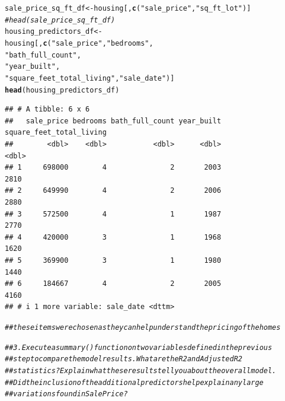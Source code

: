 \documentclass{article}\usepackage[]{graphicx}\usepackage[]{xcolor}
\makeatletter
\newcommand{\hlstr}[1]{\textcolor[rgb]{0.192,0.494,0.8}{#1}}%
\newcommand{\hlcom}[1]{\textcolor[rgb]{0.678,0.584,0.686}{\textit{#1}}}%
\newcommand{\hlstd}[1]{\textcolor[rgb]{0.345,0.345,0.345}{#1}}%
\newcommand{\hlkwb}[1]{\textcolor[rgb]{0.69,0.353,0.396}{#1}}%
\newcommand{\hlkwd}[1]{\textcolor[rgb]{0.737,0.353,0.396}{\textbf{#1}}}%
\newenvironment{kframe}{%
 \def\at@end@of@kframe{}%
 \ifinner\ifhmode%
  \def\at@end@of@kframe{\end{minipage}}%
  \begin{minipage}{\columnwidth}%
 \fi\fi%
 \def\FrameCommand##1{\hskip\@totalleftmargin \hskip-\fboxsep
 \colorbox{shadecolor}{##1}\hskip-\fboxsep
     \hskip-\linewidth \hskip-\@totalleftmargin \hskip\columnwidth}%
 \MakeFramed {\advance\hsize-\width
   \@totalleftmargin\z@ \linewidth\hsize
   \@setminipage}}%
 {\par\unskip\endMakeFramed%
 \at@end@of@kframe}
\newenvironment{knitrout}{}{} %
\makeatother
\begin{document}
\begin{knitrout}
\begin{kframe}
\begin{alltt}
\hlstd{sale_price_sq_ft_df} \hlkwb{<-} \hlstd{housing [,}\hlkwd{c}\hlstd{(}\hlstr{"sale_price"}\hlstd{,}\hlstr{"sq_ft_lot"}\hlstd{)]}
\hlcom{#head(sale_price_sq_ft_df)}
\hlstd{housing_predictors_df} \hlkwb{<-}
  \hlstd{housing[,} \hlkwd{c}\hlstd{(}\hlstr{"sale_price"}\hlstd{,}\hlstr{"bedrooms"}\hlstd{,}
              \hlstr{"bath_full_count"}\hlstd{,}
              \hlstr{"year_built"}\hlstd{,}
              \hlstr{"square_feet_total_living"}\hlstd{,}\hlstr{"sale_date"}\hlstd{)]}
\hlkwd{head}\hlstd{(housing_predictors_df)}
\end{alltt}
\begin{verbatim}
## # A tibble: 6 x 6
##   sale_price bedrooms bath_full_count year_built square_feet_total_living
##        <dbl>    <dbl>           <dbl>      <dbl>                    <dbl>
## 1     698000        4               2       2003                     2810
## 2     649990        4               2       2006                     2880
## 3     572500        4               1       1987                     2770
## 4     420000        3               1       1968                     1620
## 5     369900        3               1       1980                     1440
## 6     184667        4               2       2005                     4160
## # i 1 more variable: sale_date <dttm>
\end{verbatim}
\begin{alltt}
\hlcom{## these items were chosen as they can help understand the pricing of the homes}



\hlcom{## 3. Execute a summary() function on two variables defined in the previous }
\hlcom{## step to compare the model results. What are the R2 and Adjusted R2 }
\hlcom{## statistics? Explain what these results tell you about the overall model. }
\hlcom{## Did the inclusion of the additional predictors help explain any large }
\hlcom{## variations found in Sale Price?}



\end{alltt}
\end{kframe}
\end{knitrout}
\end{document}
